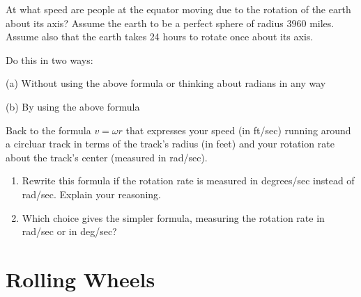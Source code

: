 \documentclass{ximera}
\begin{document}
\begin{question}  \label{Q255: Angles}
At what speed are people at the equator moving due to the rotation of the earth about its axis? Assume the earth to be a perfect sphere of radius $3960$ miles. Assume also that the earth takes 24 hours to rotate once about its axis.

Do this in two ways:

(a) Without using the above formula or thinking about radians in any way

(b) By using the above formula

\end{question}

\begin{question}  \label{Q2455: Angles}
Back to the formula $v=\omega r$ that expresses your speed (in ft/sec) running around a circluar track in terms of the track's radius (in feet) and your rotation rate about the track's center (measured in rad/sec).

\begin{enumerate}
\item Rewrite this formula if the rotation rate is measured in degrees/sec instead of rad/sec. Explain your reasoning.

\item Which choice gives the simpler formula, measuring the rotation rate in rad/sec or in deg/sec?
\end{enumerate}
\end{question}




\section{Rolling Wheels}
\end{document}
